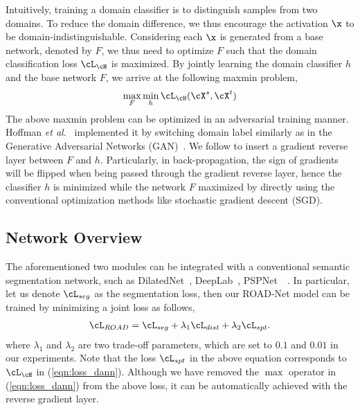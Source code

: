 \documentclass[10pt,twocolumn,letterpaper]{article}
\makeatletter
\def\etal{\emph{et al.}\@\xspace}
\makeatother
\begin{document}
Intuitively, training a domain classifier is to distinguish samples from two domains. To reduce the domain difference, we thus encourage the activation $\x$ to be domain-indistinguishable. Considering each $\x$ is generated from a base network, denoted by $F$, we thus need to optimize $F$ such that the domain classification loss $\cL_{\cH}$ is maximized. By jointly learning the domain classifier $h$ and the base network $F$, we arrive at the following maxmin problem, 
\begin{eqnarray}
\label{eqn:loss_dann}
\max_{F}\min_{h} \cL_{\cH}(\cX^s, \cX^t)
\end{eqnarray}
The above maxmin problem can be optimized in an adversarial training manner. Hoffman \etal~\cite{hoffman2016fcns} implemented it by switching domain label similarly as in the Generative Adversarial Networks (GAN)~\cite{goodfellow2014generative}. We follow \cite{ganin2015unsupervised} to insert a gradient reverse layer between $F$ and $h$. Particularly, in back-propagation, the sign of gradients will be flipped when being passed through the gradient reverse layer, hence the classifier $h$ is minimized while the network $F$  maximized by directly using the conventional optimization methods like stochastic gradient descent (SGD). 

\subsection{Network Overview}

The aforementioned two modules can be integrated with a conventional semantic segmentation network, such as DilatedNet~\cite{yu2015multi}, DeepLab~\cite{chen2016deeplab}, PSPNet~\cite{zhao2016pyramid}~\etc. In particular, let us denote $\cL_{seg}$ as the segmentation loss, then our ROAD-Net model can be trained by minimizing a joint loss as follows, 
\begin{eqnarray}
\cL_{ROAD} = \cL_{seg} + \lambda_1 \cL_{dist} + \lambda_2\cL_{spt}. 
\end{eqnarray}
where $\lambda_1$ and $\lambda_2$ are two trade-off parameters, which are set to $0.1$ and $0.01$ in our experiments. Note that the loss $\cL_{spt}$ in the above equation corresponds to $\cL_{\cH}$ in (\ref{eqn:loss_dann}). Although we have removed the $\max$ operator in (\ref{eqn:loss_dann}) from the above loss, it can be automatically achieved with the reverse gradient layer. 
\end{document}
